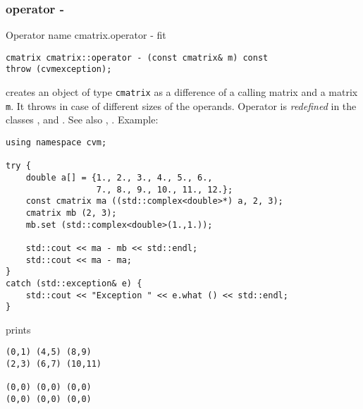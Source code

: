 \subsubsection{operator -}
Operator%
\pdfdest name {cmatrix.operator -} fit
\begin{verbatim}
cmatrix cmatrix::operator - (const cmatrix& m) const
throw (cvmexception);
\end{verbatim}
creates an object of type \verb"cmatrix" as a difference of
a calling  matrix and a matrix \verb"m".
It throws  
in case of different sizes of the operands.
Operator is \emph{redefined} in the classes
,  
and .
See also , .
Example:
\begin{Verbatim}
using namespace cvm;

try {
    double a[] = {1., 2., 3., 4., 5., 6.,
                  7., 8., 9., 10., 11., 12.};
    const cmatrix ma ((std::complex<double>*) a, 2, 3);
    cmatrix mb (2, 3);
    mb.set (std::complex<double>(1.,1.));

    std::cout << ma - mb << std::endl;
    std::cout << ma - ma;
}
catch (std::exception& e) {
    std::cout << "Exception " << e.what () << std::endl;
}
\end{Verbatim}
prints
\begin{Verbatim}
(0,1) (4,5) (8,9)
(2,3) (6,7) (10,11)

(0,0) (0,0) (0,0)
(0,0) (0,0) (0,0)
\end{Verbatim}
\newpage



